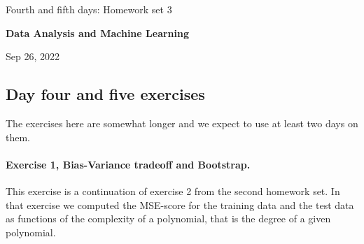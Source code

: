 \documentclass[%
oneside,                 %
final,                   %
10pt]{article}
\begin{document}

\newcommand{\exercisesection}[1]{\subsection*{#1}}






\thispagestyle{empty}

\begin{center}
{\LARGE\bf
\begin{spacing}{1.25}
Fourth and fifth days: Homework set 3
\end{spacing}
}
\end{center}


\begin{center}
{\bf Data Analysis and Machine Learning${}^{}$} \\ [0mm]
\end{center}

\begin{center}
\end{center}
    

\begin{center}
Sep 26, 2022
\end{center}

\vspace{1cm}


\subsection{Day four and five exercises}

The exercises here are somewhat longer and we expect to use at least two days on them.

\paragraph{Exercise 1, Bias-Variance tradeoff and Bootstrap.}
This exercise is a continuation of exercise 2 from the second homework set.
In that exercise we computed the MSE-score for the training
data and the test data as functions of the complexity of a polynomial,
that is the degree of a given polynomial.
\end{document}
